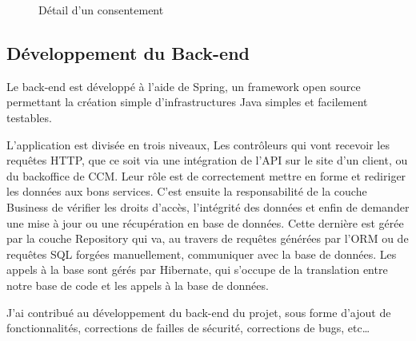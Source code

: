 \documentclass[12pt, a4paper]{report}
\begin{document}
\begin{figure}[H]
    \begin{center}
    \end{center}
    \caption{Détail d'un consentement}
\end{figure}
\newpage

\subsection{Développement du Back-end}
Le back-end est développé à l'aide de Spring, un framework open source permettant la création simple d'infrastructures Java simples et facilement testables.\newline

L'application est divisée en trois niveaux,\newline
Les contrôleurs qui vont recevoir les requêtes HTTP, que ce soit via une intégration de l'API sur le site d'un client, ou du backoffice de CCM. Leur rôle est de correctement mettre en forme et rediriger les données aux bons services.\newline
C'est ensuite la responsabilité de la couche Business de vérifier les droits d'accès, l'intégrité des données et enfin de demander une mise à jour ou une récupération en base de données.\newline
Cette dernière est gérée par la couche Repository qui va, au travers de requêtes générées par l'ORM ou de requêtes SQL forgées manuellement, communiquer avec la base de données.
Les appels à la base sont gérés par Hibernate, qui s'occupe de la translation entre notre base de code et les appels à la base de données.\newline

J'ai contribué au développement du back-end du projet, sous forme d'ajout de fonctionnalités, corrections de failles de sécurité, corrections de bugs, etc\ldots
\end{document}
